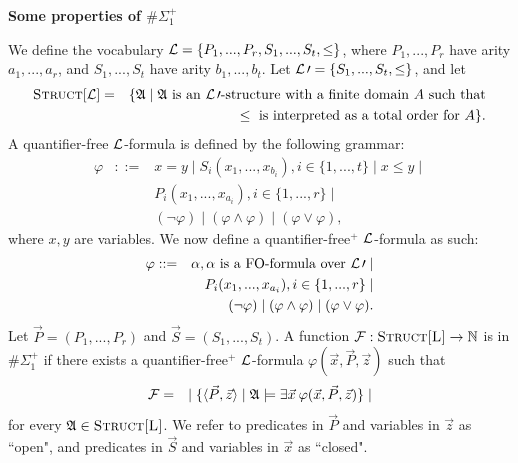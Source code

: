 \documentclass[12pt]{article}
\def\A{{\frak A}}
\def\L{{\cal L}}
\def\F{{\cal F}}
\def\P{\vec{P}}
\def\S{\vec{S}}
\def\x{\vec{x}}
\def\z{\vec{z}}
\begin{document}
\begin{center}
{ \LARGE \bf
  Some properties of $\#\Sigma_1^{+}$
}
\end{center}

We define the vocabulary $\L = \{ P_1, ..., P_r, S_1,...,S_t, \leq \}$, where $P_1, ..., P_r$ have arity $a_1,...,a_r$, and $S_1,...,S_t$ have arity $b_1,...,b_t$. Let $\L\prime = \{ S_1,...,S_t, \leq \}$, and let
\begin{eqnarray*}
\textsc{Struct}[\L] &=& \{\A \mid \A \text{ is an } \L\prime \text{-structure with a finite domain } A \text{ such that} \\
&& \leq \text{ is interpreted as a total order for } A \}.
\end{eqnarray*}
A quantifier-free $\L$-formula is defined by the following grammar:
\begin{eqnarray*}
\varphi &::=& x = y \mid S_i(x_1,...,x_{b_i}), i \in \{1,...,t\} \mid x \leq y \mid \\
&& P_i(x_1,...,x_{a_i}), i \in \{1,...,r\} \mid \\ 
&& (\neg \varphi) \mid (\varphi \wedge \varphi) \mid (\varphi \vee \varphi),
\end{eqnarray*}
where $x, y$ are variables. We now define a quantifier-free$^{+}$ $\L$-formula as such:
\begin{eqnarray*}
\varphi &::=& \alpha, \alpha \text{ is a FO-formula over } \L\prime  \mid \\
&& P_i(x_1,...,x_{a_i}), i \in \{1,...,r\} \mid \\
&& (\neg \varphi) \mid (\varphi \wedge \varphi) \mid (\varphi \vee \varphi).
\end{eqnarray*}
Let $\P = (P_1, ..., P_r)$ and $\S = (S_1,...,S_t)$. A function $\F:\textsc{Struct[\L]} \to \mathbb{N}$ is in $\#\Sigma_1^+$ if there exists a quantifier-free$^{+}$ $\L$-formula $\varphi(\x,\P,\z)$ such that
\begin{eqnarray*}
\F &=& \mid \{ \langle \P, \z \rangle \mid \A \models \exists \x \: \varphi(\x,\P,\z) \} \mid
\end{eqnarray*}
for every $\A \in \textsc{Struct[\L]}$. We refer to predicates in $\P$ and variables in $\z$ as ``open", and predicates in $\S$ and variables in $\x$ as ``closed".
\end{document}
